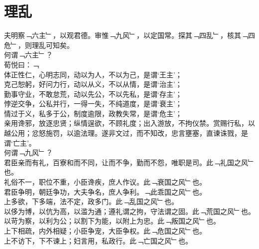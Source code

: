 \chapter{理乱}%
夫明察﹁六主﹂，以观君德。审惟﹁九风﹂，以定国常。探其﹁四乱﹂，核其﹁四危﹂，则理乱可知矣。\\
何谓﹁六主﹂？\\
荀悦曰：﹁\\
体正性仁，心明志同，动以为人，不以为己，是谓‘王主’；\\
克己恕躬，好问力行，动以从义，不以从情，是谓‘治主’；\\
勤事守业，不敢怠荒，动以先公，不以先私，是谓‘存主’；\\
悖逆交争，公私并行，一得一失，不纯道度，是谓‘衰主’；\\
情过于义，私多于公，制度逾限，政教失常，是谓‘危主’；\\
亲用谗邪，放逐忠贤；纵情逞欲，不顾礼度；出入游放，不拘仪禁。赏赐行私，以越公用；忿怒施罚，以逾法理。遂非文过，而不知改，忠言壅塞，直谏诛戮，是谓‘亡主’。
\\
何谓﹁九风﹂？\\
君臣亲而有礼，百寮和而不同，让而不争，勤而不怨，唯职是司。此﹁礼国之风﹂也。\\
礼俗不一，职位不重，小臣谗疾，庶人作议。此﹁衰国之风﹂也。\\
君臣争明，朝廷争功，大夫争名，庶人争利。﹁此乖国之风﹂也。\\
上多欲，下多端，法不定，政多门。此﹁乱国之风﹂也。\\
以侈为博，以伉为高，以滥为通；遵礼谓之拘，守法谓之固。此﹁荒国之风﹂也。\\
以苛为察，以利为公；以割下为能，以附上为忠。此﹁叛国之风﹂也。\\
上下相疏，内外相疑；小臣争宠，大臣争权。此﹁危国之风﹂也。\\
上不访下，下不谏上；妇言用，私政行。此﹁亡国之风﹂也。\\
